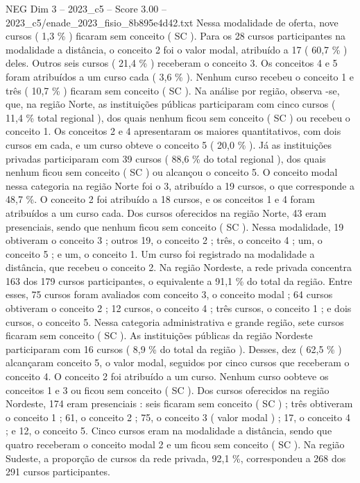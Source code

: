 \begin{textsample}{NEG Dim 3 – 2023\_c5 – Score 3.00 – 2023\_c5/enade\_2023\_fisio\_8b895e4d42.txt}
Nessa modalidade de oferta, nove cursos ( 1,3 \% ) ficaram sem conceito ( SC ).
Para os 28 cursos participantes na modalidade a distância, o conceito 2 foi o valor modal, atribuído a 17 ( 60,7 \% ) deles.
Outros seis cursos ( 21,4 \% ) receberam o conceito 3.
Os conceitos 4 e 5 foram atribuídos a um curso cada ( 3,6 \% ).
Nenhum curso recebeu o conceito 1 e três ( 10,7 \% ) ficaram sem conceito ( SC ).
Na análise por região, observa -se, que, na região Norte, as instituições públicas participaram com cinco cursos ( 11,4 \% total regional ), dos quais nenhum ficou sem conceito ( SC ) ou recebeu o conceito 1.
Os conceitos 2 e 4 apresentaram os maiores quantitativos, com dois cursos em cada, e um curso obteve o conceito 5 ( 20,0 \% ).
Já as instituições privadas participaram com 39 cursos ( 88,6 \% do total regional ), dos quais nenhum ficou sem conceito ( SC ) ou alcançou o conceito 5.
O conceito modal nessa categoria na região Norte foi o 3, atribuído a 19 cursos, o que corresponde a 48,7 \%.
O conceito 2 foi atribuído a 18 cursos, e os conceitos 1 e 4 foram atribuídos a um curso cada.
Dos cursos oferecidos na região Norte, 43 eram presenciais, sendo que nenhum ficou sem conceito ( SC ).
Nessa modalidade, 19 obtiveram o conceito 3 ; outros 19, o conceito 2 ; três, o conceito 4 ; um, o conceito 5 ; e um, o conceito 1.
Um curso foi registrado na modalidade a distância, que recebeu o conceito 2.
Na região Nordeste, a rede privada concentra 163 dos 179 cursos participantes, o equivalente a 91,1 \% do total da região.
Entre esses, 75 cursos foram avaliados com conceito 3, o conceito modal ; 64 cursos obtiveram o conceito 2 ; 12 cursos, o conceito 4 ; três cursos, o conceito 1 ; e dois cursos, o conceito 5.
Nessa categoria administrativa e grande região, sete cursos ficaram sem conceito ( SC ).
As instituições públicas da região Nordeste participaram com 16 cursos ( 8,9 \% do total da região ).
Desses, dez ( 62,5 \% ) alcançaram conceito 5, o valor modal, seguidos por cinco cursos que receberam o conceito 4.
O conceito 2 foi atribuído a um curso.
Nenhum curso oobteve os conceitos 1 e 3 ou ficou sem conceito ( SC ).
Dos cursos oferecidos na região Nordeste, 174 eram presenciais : seis ficaram sem conceito ( SC ) ; três obtiveram o conceito 1 ; 61, o conceito 2 ; 75, o conceito 3 ( valor modal ) ; 17, o conceito 4 ; e 12, o conceito 5.
Cinco cursos eram na modalidade a distância, sendo que quatro receberam o conceito modal 2 e um ficou sem conceito ( SC ).
Na região Sudeste, a proporção de cursos da rede privada, 92,1 \%, correspondeu a 268 dos 291 cursos participantes.

\end{textsample}
